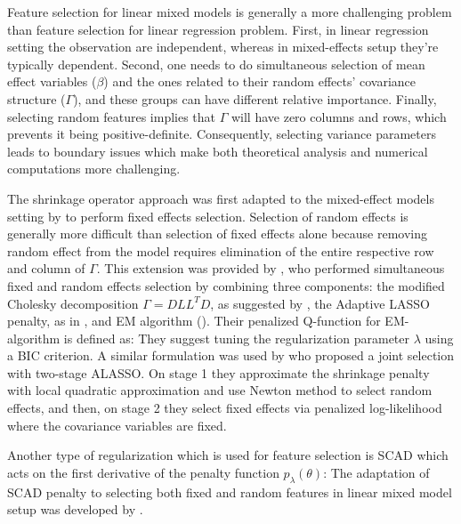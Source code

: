 \documentclass[11pt,letterpaper]{article}
\numberwithin{equation}{section} %
\numberwithin{figure}{section} %
\numberwithin{table}{section} %
\begin{document}
  Feature selection for linear mixed models is generally a more challenging problem than feature selection for linear regression problem. First, in linear regression setting the observation are independent, whereas in mixed-effects setup they're typically dependent. Second, one needs to do simultaneous selection of mean effect variables ($\beta$) and the ones related to their random effects' covariance structure ($\Gamma$), and these groups can have different relative importance. Finally, selecting random features implies that $\Gamma$ will have zero columns and rows, which prevents it being positive-definite. Consequently, selecting variance parameters leads to boundary issues which make both theoretical analysis and numerical computations more challenging.
  
   The shrinkage operator approach was first adapted to the mixed-effect models setting by \cite{Lan2006} to perform fixed effects selection. Selection of random effects is generally more difficult than selection of fixed effects alone because removing random effect from the model requires elimination of the entire respective row and column of $\Gamma$. This extension was provided by \cite{Krishna2008}, who  performed simultaneous fixed and random effects selection by combining three components: the modified Cholesky decomposition $\Gamma = DLL^TD$, as suggested by \cite{Chen2003}, the Adaptive LASSO penalty, as in \cite{Lan2006}, and EM algorithm (\cite{Dempster1977}). Their penalized Q-function for EM-algorithm is defined as:
   They suggest tuning the regularization parameter $\lambda$ using a BIC criterion. A similar formulation was used by \cite{Lin2013} who proposed a joint selection with two-stage ALASSO. On stage 1 they approximate the shrinkage penalty with local quadratic approximation and use Newton method to select random effects, and then, on stage 2 they select fixed effects via penalized log-likelihood where the covariance variables are fixed. 
   
   Another type of regularization which is used for feature selection is SCAD \cite{Fan2001} which acts on the first derivative of the penalty function $p_\lambda(\theta)$:
   The adaptation of SCAD penalty to selecting both fixed and random features in linear mixed model setup was developed by \cite{Fan2012}.
  
\end{document}

